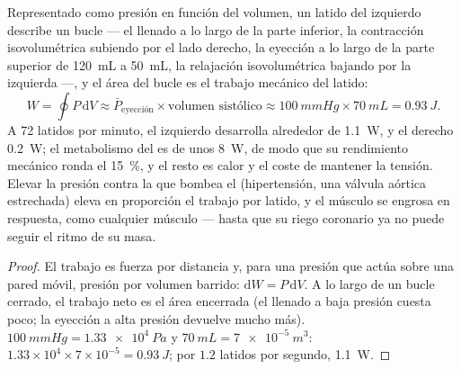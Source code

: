 \begin{theorem}\label{thm:b2:heart:work}
Representado como presión en función del volumen, un latido del 
izquierdo describe un bucle --- el llenado a lo largo de la parte inferior,
la contracción isovolumétrica subiendo por el lado derecho, la eyección a
lo largo de la parte superior de \qty{120}{mL} a \qty{50}{mL}, la
relajación isovolumétrica bajando por la izquierda ---, y el área del bucle
es el trabajo mecánico del latido:
\[
W = \oint P\,\mathrm{d}V \approx \bar P_{\text{eyección}}\times \text{volumen sistólico} \approx \qty{100}{mmHg}\times\qty{70}{mL} = \qty{0.93}{J}.
\]
A 72 latidos por minuto, el  izquierdo desarrolla alrededor de
\qty{1.1}{W}, y el derecho \qty{0.2}{W}; el metabolismo del  es de
unos \qty{8}{W}, de modo que su rendimiento mecánico ronda el \qty{15}{\%},
y el resto es calor y el coste de mantener la tensión. Elevar la presión
contra la que bombea el  (hipertensión, una válvula aórtica
estrechada) eleva en proporción el trabajo por latido, y el músculo se
engrosa en respuesta, como cualquier músculo --- hasta que su riego
coronario ya no puede seguir el ritmo de su masa.
\end{theorem}
\begin{proof}
El trabajo es fuerza por distancia y, para una presión que actúa sobre una
pared móvil, presión por volumen barrido: $\mathrm{d}W = P\,\mathrm{d}V$.
A lo largo de un bucle cerrado, el trabajo neto es el área encerrada (el
llenado a baja presión cuesta poco; la eyección a alta presión devuelve
mucho más). $\qty{100}{mmHg} = \qty{1.33e4}{Pa}$ y $\qty{70}{mL} =
\qty{7e-5}{m^3}$: $1.33\times 10^{4}\times 7\times 10^{-5} =
\qty{0.93}{J}$; por $1.2$ latidos por segundo, \qty{1.1}{W}.
\end{proof}


